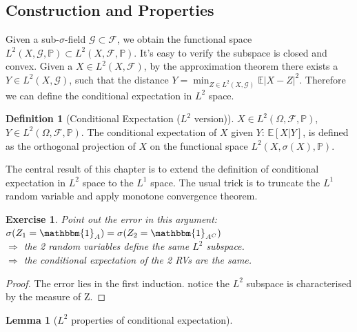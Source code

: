 \documentclass[a4paper,11pt]{book}
\newtheorem{lemma}[theorem]{Lemma}
\newtheorem{exercise}{Exercise}[subsection]
\theoremstyle{definition}
\newtheorem{definition}{Definition}[section]
\theoremstyle{remark}
\begin{document}
\subsection{Construction and Properties}
Given a sub-$\sigma$-field $\mathcal{G}\subset \mathcal{F}$, we obtain the functional space $L^2(X, \mathcal{G}, \mathbb{P}) \subset L^2(X, \mathcal{F}, \mathbb{P})$. It's easy to verify the subspace is closed and convex. Given a $X \in L^2(X, \mathcal{F})$, by the approximation theorem there exists a $Y \in L^2(X, \mathcal{G})$, such that the distance $Y = \min_{ Z \in L^2(X, \mathcal{G})}\mathbb{E}|X - Z|^2$. Therefore we can define the conditional expectation in $L^2$ space.
\begin{definition}[Conditional Expectation ($L^2$ version)]
$X \in L^2(\Omega, \mathcal{F}, \mathbb{P})$, $Y \in L^2(\Omega, \mathcal{F}, \mathbb{P})$. The conditional expectation of $X$ given $Y$: $\mathbb{E}[X|Y]$,  is defined as the orthogonal projection of $X$ on the functional space $L^2(X, \sigma(X), \mathbb{P})$.
\end{definition}

The central result of this chapter is to extend the definition of conditional expectation in $L^2$ space to the $L^1$ space. The usual trick is to truncate the $L^1$ random variable and apply monotone convergence theorem.

\begin{exercise}
	Point out the error in this argument:\\
	$\sigma(Z_1 = \mathbbm{1}_A) = \sigma( Z_2 = \mathbbm{1}_{A^C})$\\
	$\Rightarrow$ the 2 random variables define the same $L^2$ subspace.\\
	$\Rightarrow$ the conditional expectation of the 2 RVs are the same.
\end{exercise}
\begin{proof}
	The error lies in the first induction. notice the $L^2$ subspace is characterised by the measure of Z.
\end{proof}

\begin{lemma}[$L^2$ properties of conditional expectation]
	
\end{lemma}
\end{document}
